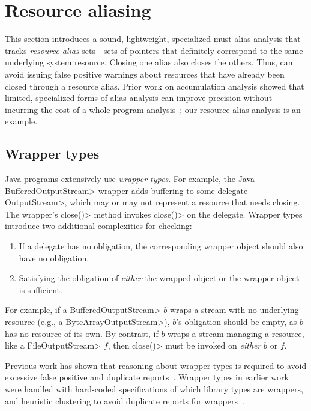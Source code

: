 \section{Resource aliasing}
\label{sec:must-call-choice}


This section introduces a sound, lightweight, specialized must-alias analysis
that tracks \emph{resource alias} sets---sets of pointers that
definitely correspond to the same underlying system resource.  Closing
one alias also closes the others.  Thus,
\tool can avoid issuing false positive warnings about resources
that have already been closed through a resource alias.  Prior
work on accumulation analysis showed that limited, specialized forms
of alias analysis can improve precision
without incurring the cost of a whole-program
analysis~\cite{KelloggRSSE2020}; our resource alias analysis is an
example.

\subsection{Wrapper types}
\label{sec:wrapper-types}

Java programs extensively use \emph{wrapper types}.  For example, the Java
\<BufferedOutputStream> wrapper adds buffering to some delegate \<OutputStream>, which
may or may not represent a resource that needs closing.  The wrapper's 
\<close()> method invokes \<close()> on the delegate.
Wrapper types
introduce two additional complexities for \MustCall checking:
\begin{enumerate}
  \item If a delegate has no \MustCall obligation, the corresponding
  wrapper object should also have no obligation.
  \item Satisfying the obligation of \emph{either} the wrapped object or the
  wrapper object is sufficient.
\end{enumerate}
For example, if a \<BufferedOutputStream> $b$ wraps a stream with no underlying
resource (e.g., a \<ByteArrayOutputStream>), $b$'s
\MustCall obligation should be empty,
as $b$ has no resource of its own.  By contrast,
if $b$ wraps a stream managing a resource, like a \<File\-Out\-put\-Stream> $f$,
then \<close()> must be invoked on \emph{either} $b$ or $f$.

Previous work has shown that reasoning about wrapper types is
required to avoid excessive false positive and duplicate
reports~\cite{TorlakC10,ecj-resource-leak}.  Wrapper types in earlier
work were handled with hard-coded specifications of which library
types are wrappers, and heuristic clustering to avoid duplicate reports for
wrappers~\cite{TorlakC10}.

